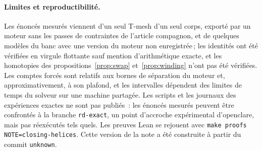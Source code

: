 \documentclass[11pt,a4paper]{article}
\providecommand{\enginecommit}{unknown}
\begin{document}
\paragraph{Limites et reproductibilité.}
Les énoncés mesurés viennent d'un seul T-mesh d'un seul corps, exporté par un
moteur sans les passes de contraintes de l'article compagnon, et de quelques
modèles du banc avec une version du moteur non enregistrée\,; les identités
ont été vérifiées en virgule flottante sauf mention d'arithmétique exacte, et
les homotopies des propositions~\ref{prop:swap} et~\ref{prop:winding} n'ont
pas été vérifiées. Les comptes forcés sont relatifs aux bornes de séparation
du moteur et, approximativement, à son plafond, et les intervalles dépendent
des limites de temps du solveur sur une machine partagée. Les scripts et les
journaux des expériences exactes ne sont pas publiés~: les énoncés mesurés
peuvent être confrontés à la branche \texttt{rd-exact}, un point d'accroche
expérimental d'openclare, mais pas réexécutés tels quels. Les preuves Lean se
rejouent avec \texttt{make proofs NOTE=closing-helices}. Cette version de la
note a été construite à partir du commit \texttt{\enginecommit}.
\end{document}
